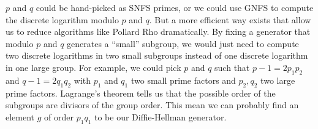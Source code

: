 \documentclass[a4paper,11pt,twocolumn]{article}
\begin{document}
$p$ and $q$ could be hand-picked as SNFS primes, or we could use GNFS to compute the discrete logarithm modulo $p$ and $q$. But a more efficient way exists that allow us to reduce algorithms like Pollard Rho dramatically. By fixing a generator that modulo $p$ and $q$ generates a ``small'' subgroup, we would just need to compute two discrete logarithms in two small subgroups instead of one discrete logarithm in one large group. For example, we could pick $p$ and $q$ such that $p-1 = 2p_1p_2$ and $q-1=2q_1q_2$ with $p_1$ and $q_1$ two small prime factors and $p_2, q_2$ two large prime factors. Lagrange's theorem tells us that the possible order of the subgroups are divisors of the group order. This mean we can probably find an element $g$ of order $p_1q_1$ to be our Diffie-Hellman generator.

\begin{center}
\end{center}
\end{document}
